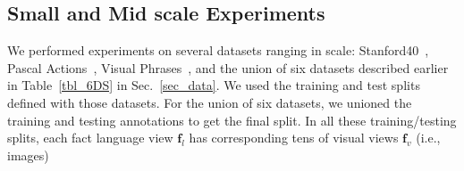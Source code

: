 \documentclass[runningheads]{llncs}
\begin{document}
\begin{comment}
      & \textbf{Image-Sentence TACL15  ~\cite{kiros2014unifying} (retrained)} & 26.13 & 41.10 & 30.94 & 26.17  & 56.10 & 40.4 & 0.94 \\
\hline
    \end{tabular}%
    }
\end{table}
\end{comment}\vspace{-2mm}\subsection{Small and Mid scale Experiments}\vspace{-2mm}%
We  performed experiments on several  datasets ranging in scale: Stanford40~\cite{yao2011human}, Pascal Actions~\cite{yao2010grouplet}, Visual Phrases~\cite{sadeghi2011recognition}, and the union of six datasets described earlier in Table~\ref{tbl_6DS} in Sec.~\ref{sec_data}. We used the training and test splits defined with those datasets. For the union of six datasets, we unioned the training and testing annotations to get the final split.  In all these training/testing splits, each fact language view $\mathbf{f}_l$ has corresponding tens of visual views $\mathbf{f}_v$ (i.e., images)
\end{document}
